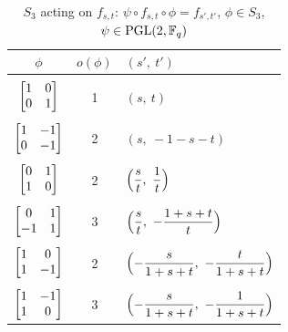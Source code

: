 \documentclass{amsart}
\numberwithin{equation}{section}
\theoremstyle{definition}
\newcommand{\f}{\Bbb F}
\newcommand{\pgl}{\mathrm{PGL}}
\begin{document}
\begin{table}[ht]
\caption{$S_3$ acting on $f_{s,t}$: $\psi\circ f_{s,t}\circ\phi=f_{s',t'}$, $\phi\in S_3$, $\psi\in\pgl(2,\f_q)$}\label{tb2}
    \centering
\begin{tabular}{c|c|l}
$\phi$ & $o(\phi)$ &\hfil $(s',\ t')$\\ \hline 
\vspace{-0.8em} & \\
$\left[\begin{matrix}1&0\cr 0&1\end{matrix}
\right]$ & 1& $(s,\ t)$\\ 
\vspace{-0.8em} & \\
$\left[\begin{matrix}1&-1\cr 0&-1\end{matrix}
\right]$ & 2 & $(s,\ -1-s-t)$\\
\vspace{-0.8em} & \\
$\left[\begin{matrix}0&1\cr 1&0\end{matrix}
\right]$ & 2 & $\displaystyle \Bigl(\frac st,\ \frac 1t\Bigr)$\\
\vspace{-0.8em} & \\
$\left[\begin{matrix}0&1\cr -1&1\end{matrix}
\right]$ &  3 &$\displaystyle \Bigl(\frac st,\ -\frac{1+s+t}t\Bigr)$\\
\vspace{-0.8em} & \\
$\left[\begin{matrix}1&0\cr 1&-1\end{matrix}
\right]$ & 2 &  $\displaystyle \Bigl(-\frac s{1+s+t},\ -\frac t{1+s+t}\Bigr)$\\
\vspace{-0.8em} & \\
$\left[\begin{matrix}1&-1\cr 1&0\end{matrix}
\right]$ & 3 & $\displaystyle \Bigl(-\frac s{1+s+t},\ -\frac 1{1+s+t}\Bigr)$
\end{tabular}
\end{table}
\end{document}

